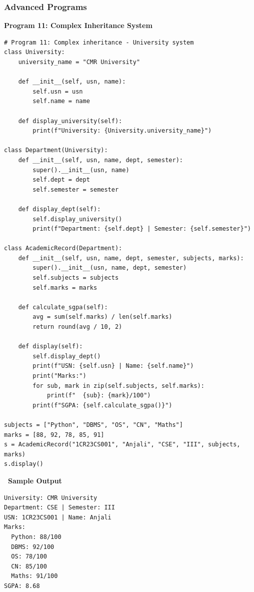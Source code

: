 \documentclass[12pt,a4paper]{article}
\newcommand{\outhead}{\noindent\colorbox{cmrgreen!25}%
  {\textbf{\small\color{cmrdark}~Sample Output~}}\par\vspace{-1pt}}
\begin{document}
\subsubsection{Advanced Programs}

\textbf{Program 11: Complex Inheritance System}

\begin{lstlisting}
# Program 11: Complex inheritance - University system
class University:
    university_name = "CMR University"

    def __init__(self, usn, name):
        self.usn = usn
        self.name = name

    def display_university(self):
        print(f"University: {University.university_name}")

class Department(University):
    def __init__(self, usn, name, dept, semester):
        super().__init__(usn, name)
        self.dept = dept
        self.semester = semester

    def display_dept(self):
        self.display_university()
        print(f"Department: {self.dept} | Semester: {self.semester}")

class AcademicRecord(Department):
    def __init__(self, usn, name, dept, semester, subjects, marks):
        super().__init__(usn, name, dept, semester)
        self.subjects = subjects
        self.marks = marks

    def calculate_sgpa(self):
        avg = sum(self.marks) / len(self.marks)
        return round(avg / 10, 2)

    def display(self):
        self.display_dept()
        print(f"USN: {self.usn} | Name: {self.name}")
        print("Marks:")
        for sub, mark in zip(self.subjects, self.marks):
            print(f"  {sub}: {mark}/100")
        print(f"SGPA: {self.calculate_sgpa()}")

subjects = ["Python", "DBMS", "OS", "CN", "Maths"]
marks = [88, 92, 78, 85, 91]
s = AcademicRecord("1CR23CS001", "Anjali", "CSE", "III", subjects, marks)
s.display()
\end{lstlisting}

\outhead
\begin{lstlisting}[style=outputstyle]
University: CMR University
Department: CSE | Semester: III
USN: 1CR23CS001 | Name: Anjali
Marks:
  Python: 88/100
  DBMS: 92/100
  OS: 78/100
  CN: 85/100
  Maths: 91/100
SGPA: 8.68
\end{lstlisting}

\vspace{0.5cm}
\end{document}
